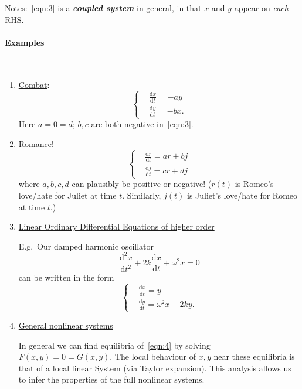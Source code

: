 \documentclass[12pt]{report}
\theoremstyle{definition}
\begin{document}
\noindent \underline{Notes}:~\eqref{eqn:3} is a \textbf{\emph{coupled system}} in general,
in that $x$ and $y$ appear on \emph{each} RHS.\@

\paragraph{Examples}
\,

\begin{enumerate}[label = (\alph*)]
    \item \underline{Combat}:\[
        \left\{\begin{align*}
            & \frac{\mathrm{d}x}{\mathrm{d}t} = -ay \\
            & \frac{\mathrm{d}y}{\mathrm{d}t} = -bx.
        \end{align*}\right.
    \]
    Here $a = 0 = d$; $b, c$ are both negative in~\eqref{eqn:3}.

\item \underline{Romance}!\[
    \left\{
        \begin{align*}
            & \frac{\mathrm{d}r}{\mathrm{d}t} = ar + bj \\
            & \frac{\mathrm{d}j}{\mathrm{d}t} = cr + dj
        \end{align*}
        \right.
\]
where $a,b,c,d$ can plausibly be positive or negative!
($r(t)$ is Romeo's love/hate for Juliet at time $t$.
Similarly, $j(t)$ is Juliet's love/hate for Romeo at time $t$.)

\item \underline{Linear Ordinary Differential Equations of higher order}

    E.g.\ Our damped harmonic oscillator\[
        \frac{\mathrm{d}^{2}x}{\mathrm{d}t^{2}} + 2k\frac{\mathrm{d}x}{\mathrm{d}t}
        + \omega^{2}x = 0
    \]can be written in the form
    \begin{equation}\label{eqn:7}
        \left\{
            \begin{align*}
                & \frac{\mathrm{d}x}{\mathrm{d}t} = y \\
                & \frac{\mathrm{d}y}{\mathrm{d}t} = \omega^{2}x - 2ky.
            \end{align*}
            \right.
    \end{equation}

\item \underline{General nonlinear systems}

    In general we can find equilibria of~\eqref{eqn:4} by solving
    $F(x,y) = 0 = G(x,y)$. The local behaviour of $x,y$ near these equilibria
    is that of a local linear System (via Taylor expansion).
    This analysis allows us to infer the properties of the full nonlinear systems.
\end{enumerate}
\end{document}
